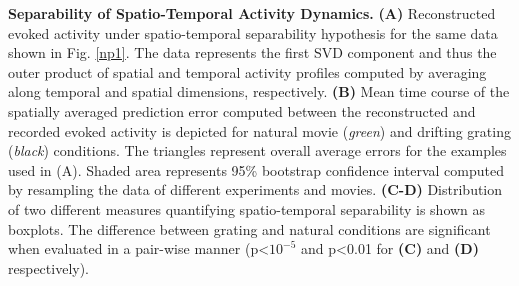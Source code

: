 \textbf{Separability of Spatio-Temporal Activity Dynamics.} \textbf{(A)}
Reconstructed evoked activity under spatio-temporal separability hypothesis
for the same data shown in Fig. \ref{np1}. The data represents the first
SVD component and thus the outer product of spatial and temporal activity
profiles computed by averaging along temporal and spatial dimensions,
respectively. \textbf{(B)} Mean time course of the spatially averaged
prediction error computed between the reconstructed and recorded evoked
activity is depicted for natural movie (\textit{green}) and drifting
grating (\textit{black}) conditions. The triangles represent overall
average errors for the examples used in (A). Shaded area represents 95\%
bootstrap confidence interval computed by resampling the data of different
experiments and movies. \textbf{(C-D)} Distribution of two different
measures quantifying spatio-temporal separability is shown as boxplots. The
difference between grating and natural conditions are significant when
evaluated in a pair-wise manner (p\textless$10^{-5}$ and p\textless0.01 for
\textbf{(C)} and \textbf{(D)} respectively).


